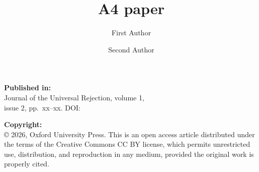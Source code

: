 \author
{
    First Author
    \and
    Second Author
}
\title{A4 paper}
\metadata
{
    \textbf{Published in:}\\
    Journal of the Universal Rejection, volume 1,\\
    issue 2, pp.~xx--xx. DOI: 

    \vspace{\baselineskip}
    \textbf{Copyright:}\\
    \copyright{} 2026, Oxford University Press. This is an open access article distributed under the
    terms of the Creative Commons CC BY license, which permits unrestricted use,
    distribution, and reproduction in any medium, provided the original work is properly cited.
}
\maketitle
\label{pap:first}


